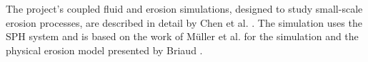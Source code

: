 The project's coupled fluid and erosion simulations, designed to study small-scale erosion processes, are described in detail by Chen et al. \cite{chen-geo-frontiers-2011}. The simulation uses the SPH system and is based on the work of M\"{u}ller et al. \cite{Muller-Particle} for the simulation and the physical erosion model presented by Briaud \cite{Briaud-ErosionByOvertopping}. 


% 
% 
% 
% 
